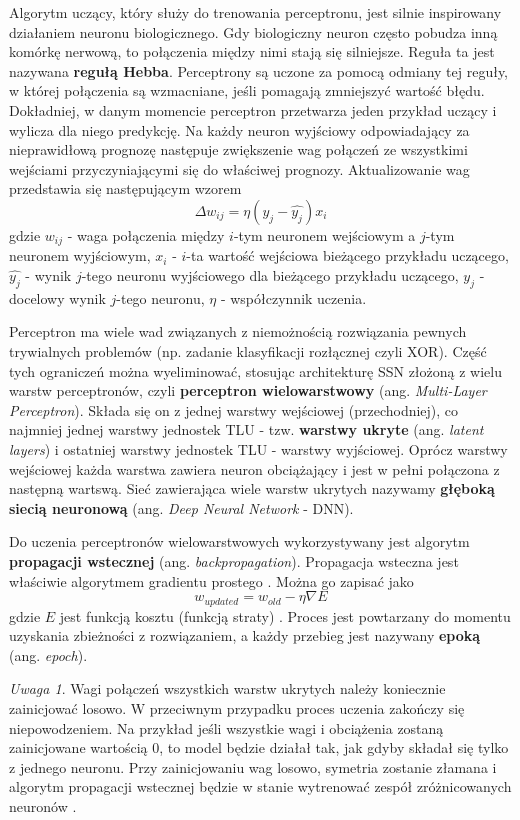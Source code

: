\documentclass[12pt]{mwbk}
\theoremstyle{plain}
\theoremstyle{definition}
\theoremstyle{remark}
\newtheorem{uwaga}{Uwaga}[chapter]
\begin{document}
Algorytm uczący, który służy do trenowania perceptronu, jest silnie inspirowany działaniem neuronu biologicznego. Gdy biologiczny neuron często pobudza inną komórkę nerwową, to połączenia między nimi stają się silniejsze. Reguła ta jest nazywana \textbf{regułą Hebba}. Perceptrony są uczone za pomocą odmiany tej reguły, w której połączenia są wzmacniane, jeśli pomagają zmniejszyć wartość błędu. Dokładniej, w danym momencie perceptron przetwarza jeden przykład uczący i wylicza dla niego predykcję. Na każdy neuron wyjściowy odpowiadający za nieprawidłową prognozę następuje zwiększenie wag połączeń ze wszystkimi wejściami przyczyniającymi się do właściwej prognozy. Aktualizowanie wag przedstawia się następującym wzorem
$$\Delta w_{ij}=\eta (y_j-\hat{y_j})x_i$$
gdzie $w_{ij}$ - waga połączenia między $i$-tym neuronem wejściowym a $j$-tym neuronem wyjściowym, $x_i$ - $i$-ta wartość wejściowa bieżącego przykładu uczącego, $\hat{y_j}$ - wynik $j$-tego neuronu wyjściowego dla bieżącego przykładu uczącego, $y_j$ - docelowy wynik $j$-tego neuronu, $\eta$ - współczynnik uczenia.

Perceptron ma wiele wad związanych z niemożnością rozwiązania pewnych trywialnych problemów (np. zadanie klasyfikacji rozłącznej czyli XOR). Część tych ograniczeń można wyeliminować, stosując architekturę SSN złożoną z wielu warstw perceptronów, czyli \textbf{perceptron wielowarstwowy} (ang. \emph{Multi-Layer Perceptron}). Składa się on z jednej warstwy wejściowej (przechodniej), co najmniej jednej warstwy jednostek TLU - tzw. \textbf{warstwy ukryte} (ang. \emph{latent layers}) i ostatniej warstwy jednostek TLU - warstwy wyjściowej. Oprócz warstwy wejściowej każda warstwa zawiera neuron obciążający i jest w pełni połączona z następną wartswą. Sieć zawierająca wiele warstw ukrytych nazywamy \textbf{głęboką siecią neuronową} (ang. \emph{Deep Neural Network} - DNN). 

Do uczenia perceptronów wielowarstwowych wykorzystywany jest algorytm \textbf{propagacji wstecznej} (ang. \emph{backpropagation}). Propagacja wsteczna jest właściwie algorytmem gradientu prostego \cite{skansi}. Można go zapisać jako
$$w_{updated}=w_{old}-\eta \nabla E$$
gdzie $E$ jest funkcją kosztu (funkcją straty) \cite{skansi}. Proces jest powtarzany do momentu uzyskania zbieżności z rozwiązaniem, a każdy przebieg jest nazywany \textbf{epoką} (ang. \emph{epoch}).

\begin{uwaga}
	Wagi połączeń wszystkich warstw ukrytych należy koniecznie zainicjować losowo. W przeciwnym przypadku proces uczenia zakończy się niepowodzeniem. Na przykład jeśli wszystkie wagi i obciążenia zostaną zainicjowane wartością 0, to model będzie działał tak, jak gdyby składał się tylko z jednego neuronu. Przy zainicjowaniu wag losowo, symetria zostanie złamana i algorytm propagacji wstecznej będzie w stanie wytrenować zespół zróżnicowanych neuronów \cite{geron}. 
\end{uwaga}
\end{document}
